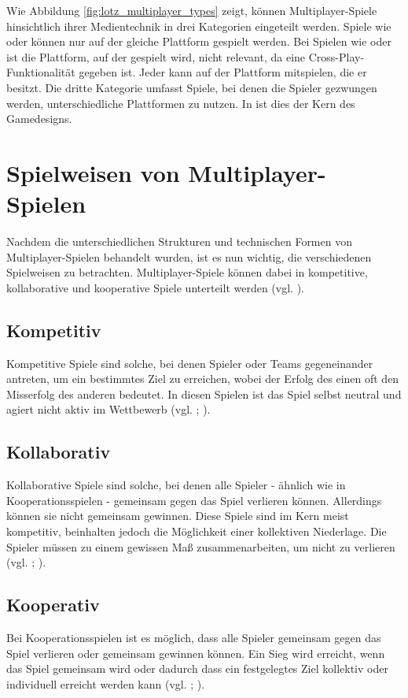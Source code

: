 Wie Abbildung \ref{fig:lotz_multiplayer_types} zeigt, können Multiplayer-Spiele hinsichtlich ihrer Medientechnik in drei Kategorien eingeteilt werden.
Spiele wie  oder  können nur auf der gleiche Plattform gespielt werden. Bei Spielen wie  oder  ist die Plattform, auf der gespielt wird, nicht relevant, da eine Cross-Play-Funktionalität gegeben ist. Jeder kann auf der Plattform mitspielen, die er besitzt. Die dritte Kategorie umfasst Spiele, bei denen die Spieler gezwungen werden, unterschiedliche Plattformen zu nutzen. In  ist dies der Kern des Gamedesigns.

\section{Spielweisen von Multiplayer-Spielen}
Nachdem die unterschiedlichen Strukturen und technischen Formen von Multiplayer-Spielen behandelt wurden, ist es nun wichtig, die verschiedenen Spielweisen zu betrachten. Multiplayer-Spiele können dabei in kompetitive, kollaborative und kooperative Spiele unterteilt werden (vgl. \citealp[S. 25f]{zagal_collaborative_2006}).

\subsection{Kompetitiv}
Kompetitive Spiele sind solche, bei denen Spieler oder Teams gegeneinander antreten, um ein bestimmtes Ziel zu erreichen, wobei der Erfolg des einen oft den Misserfolg des anderen bedeutet. In diesen Spielen ist das Spiel selbst neutral und agiert nicht aktiv im Wettbewerb (vgl. \citealp{noauthor_game_2014}; \citealp[S. 25]{zagal_collaborative_2006}).

\subsection{Kollaborativ}
Kollaborative Spiele sind solche, bei denen alle Spieler - ähnlich wie in Kooperationsspielen - gemeinsam gegen das Spiel verlieren können. Allerdings können sie nicht gemeinsam gewinnen. Diese Spiele sind im Kern meist kompetitiv, beinhalten jedoch die Möglichkeit einer kollektiven Niederlage. Die Spieler müssen zu einem gewissen Maß zusammenarbeiten, um nicht zu verlieren (vgl. \citealp{noauthor_game_2014};  \citealp[S. 25]{zagal_collaborative_2006}).

\subsection{Kooperativ}
Bei Kooperationsspielen ist es möglich, dass alle Spieler gemeinsam gegen das Spiel verlieren oder gemeinsam gewinnen können. Ein Sieg wird erreicht, wenn das Spiel gemeinsam  wird oder dadurch dass ein festgelegtes Ziel kollektiv oder individuell erreicht werden kann (vgl. \citealp{noauthor_game_2014}; \citealp[S. 25]{zagal_collaborative_2006}).

